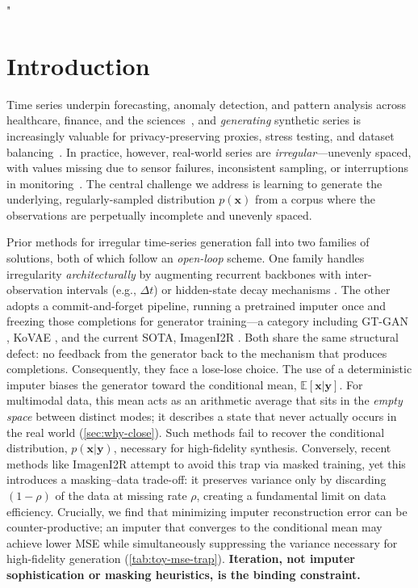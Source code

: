 "\documentclass{article}
\theoremstyle{plain}
\theoremstyle{definition}
\theoremstyle{remark}
\begin{document}
\vspace{-3mm}
\section{Introduction}
\label{sec:intro}
\vspace{-1mm}

Time series underpin forecasting, anomaly detection, and pattern analysis across healthcare, finance, and the sciences~\citep{han2019review,ismail2019deep,lim2021time}, and \emph{generating} synthetic series is increasingly valuable for privacy-preserving proxies, stress testing, and dataset balancing~\citep{brophy2023generative,nochumsohn2025data}. In practice, however, real-world series are \emph{irregular}---unevenly spaced, with values missing due to sensor failures, inconsistent sampling, or interruptions in monitoring~\citep{kidger2020ncde,ren2024learning}. The central challenge we address is learning to generate the underlying, regularly-sampled distribution $p(\mathbf{x})$ from a corpus where the observations are perpetually incomplete and unevenly spaced.

Prior methods for irregular time-series generation fall into two families of solutions, both of which follow an \emph{open-loop} scheme. One family handles irregularity \emph{architecturally} by augmenting recurrent backbones with inter-observation intervals (e.g., $\Delta t$) or hidden-state decay mechanisms \citep{che2018recurrent, jeon2022gtgan}. The other adopts a commit-and-forget pipeline, running a pretrained imputer once and freezing those completions for generator training—a category including GT-GAN \citep{jeon2022gtgan}, KoVAE \citep{naiman2024kovae}, and the current SOTA, ImagenI2R \citep{fadlon2025imageni2r}. Both share the same structural defect: no feedback from the generator back to the mechanism that produces completions. Consequently, they face a lose-lose choice. The use of a deterministic imputer biases the generator toward the conditional mean, $\mathbb{E}[\mathbf{x} | \mathbf{y}]$. For multimodal data, this mean acts as an arithmetic average that sits in the \emph{empty space} between distinct modes; it describes a state that never actually occurs in the real world (\cref{sec:why-close}). Such methods fail to recover the conditional distribution, $p(\mathbf{x} | \mathbf{y})$, necessary for high-fidelity synthesis. Conversely, recent methods like ImagenI2R attempt to avoid this trap via masked training, yet this introduces a masking--data trade-off: it preserves variance only by discarding $(1-\rho)$ of the data at missing rate $\rho$, creating a fundamental limit on data efficiency. Crucially, we find that minimizing imputer reconstruction error can be counter-productive; an imputer that converges to the conditional mean may achieve lower MSE while simultaneously suppressing the variance necessary for high-fidelity generation (\cref{tab:toy-mse-trap}). \textbf{Iteration, not imputer sophistication or masking heuristics, is the binding constraint.}
\end{document}
